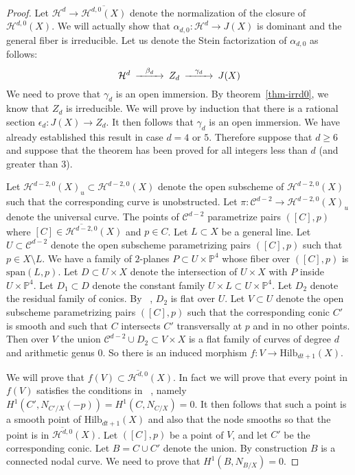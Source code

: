 \documentclass[amssymb,twoside,12 pt,amscd,reqno]{amsart}
\theoremstyle{plain}
\theoremstyle{definition}
\newcommand{\Hdg}[2]{\mathcal{H}^{#1,#2}}
\newcommand{\PP}{\mathbb{P}}
\newcommand{\HI}[2]{\text{Hilb}_{#1}(#2)}
\def\ps{\vspace{4pt}}
\begin{document}
\begin{proof}  
Let $\mathcal{H}^d\rightarrow \overline{\Hdg{d}{0}(X)}$ denote the
normalization of the closure of $\Hdg{d}{0}(X)$.  We will actually
show that $\alpha_{d,0}:\mathcal{H}^d\rightarrow J(X)$ is dominant and the
general fiber is irreducible. 
Let us denote the Stein factorization of
$\alpha_{d,0}$ as follows:
\begin{equation}\begin{CD}
\mathcal{H}^d @> \beta_d >> Z_d @> \gamma_d >> J(X)
\end{CD}\end{equation}
We need to prove that $\gamma_d$ is an open immersion.  By
theorem~\ref{thm-irrd0}, we know that $Z_d$ is irreducible.  We will
prove by induction that there is a rational section
$\epsilon_d:J(X)\rightarrow Z_d$.  It then follows that $\gamma_d$ is
an open immersion.  We have already established this result in case
$d=4$ or $5$.  Therefore suppose that $d\geq 6$ and suppose that the
theorem has been proved for all integers less than $d$ (and greater
than $3$). 

\ps

Let $\Hdg{d-2}{0}(X)_{u}\subset \Hdg{d-2}{0}(X)$ denote the
open subscheme of $\Hdg{d-2}{0}(X)$ such that the corresponding curve
is unobstructed. 
Let $\pi:\mathcal{C}^{d-2}\rightarrow \Hdg{d-2}{0}(X)_{u}$ denote the
universal curve.
The points of $\mathcal{C}^{d-2}$ parametrize pairs $([C],p)$ where
$[C]\in\overline{\Hdg{d-2}{0}}(X)$ and $p\in C$.  
  Let $L\subset X$ be a general line.  Let
$U\subset \mathcal{C}^{d-2}$ denote the open subscheme parametrizing
pairs $([C],p)$ such that $p\in X\setminus L$.  We have a family of
$2$-planes $P\subset U\times \PP^4$ whose fiber over $([C],p)$ is
$\text{span}(L,p)$.  Let $D\subset U\times X$ denote the intersection
of $U\times X$ with $P$ inside $U\times \PP^4$.  Let $D_1\subset D$
denote the constant family $U\times L\subset U\times \PP^4$.  Let
$D_2$ denote the residual family of conics.  By
~\cite[corollary 2.7]{HRS1}, $D_2$ is flat over $U$.  Let $V\subset U$
denote the open subscheme parametrizing pairs $([C],p)$ such that the
corresponding conic $C'$ is smooth and such that $C$
intersects $C'$ transversally at $p$ and in no other
points.  Then over $V$ the union $\mathcal{C}^{d-2}\cup D_2\subset
V\times X$ is a flat family of curves of degree $d$ and arithmetic
genus $0$.  So there is an induced morphism $f:V\rightarrow
\HI{dt+1}{X}$.  

\ps

We will prove that $f(V)\subset \overline{\Hdg{d}{0}}(X)$.  In fact we
will prove that every point in $f(V)$ satisfies the conditions in
~\cite[lemma 2.3]{HRS1}, namely $H^1(C',N_{C'/X}(-p))=H^1(C,N_{C/X})=0$.
It then
follows that such a point is a smooth point of $\HI{dt+1}{X}$ and
also that the node smooths so that the point is in
$\overline{\Hdg{d}{0}}(X)$. 
Let $([C],p)$
be a point of $V$, and let $C'$ be the corresponding conic.  Let
$B=C\cup C'$ denote the union.  By construction $B$ is a connected
nodal curve.  We need to prove that $H^1(B,N_{B/X})=0$.  


\end{proof}
\end{document}

